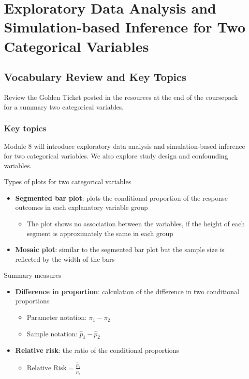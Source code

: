 \documentclass[
]{report}
\providecommand{\tightlist}{%
  \setlength{\itemsep}{0pt}\setlength{\parskip}{0pt}}
\begin{document}
\nocite{*}

\chapter{Exploratory Data Analysis and Simulation-based Inference for Two Categorical Variables}\label{exploratory-data-analysis-and-simulation-based-inference-for-two-categorical-variables}

\section{Vocabulary Review and Key Topics}\label{vocabulary-review-and-key-topics}

Review the Golden Ticket posted in the resources at the end of the coursepack for a summary two categorical variables.

\subsection{Key topics}\label{key-topics}

Module 8 will introduce exploratory data analysis and simulation-based inference for two categorical variables. We also explore study design and confounding variables.

Types of plots for two categorical variables

\begin{itemize}
\item
  \textbf{Segmented bar plot}: plots the conditional proportion of the response outcomes in each explanatory variable group

  \begin{itemize}
  \tightlist
  \item
    The plot shows no association between the variables, if the height of each segment is approximately the same in each group
  \end{itemize}
\item
  \textbf{Mosaic plot}: similar to the segmented bar plot but the sample size is reflected by the width of the bars
\end{itemize}

Summary measures

\begin{itemize}
\item
  \textbf{Difference in proportion}: calculation of the difference in two conditional proportions

  \begin{itemize}
  \item
    Parameter notation: \(\pi_1 - \pi_2\)
  \item
    Sample notation: \(\hat{p}_1 - \hat{p}_2\)
  \end{itemize}
\item
  \textbf{Relative risk}: the ratio of the conditional proportions

  \begin{itemize}
  \tightlist
  \item
    \(\text{Relative Risk} = \frac{\hat{p}_1}{\hat{p}_2}\)
  \end{itemize}
\end{itemize}
\end{document}
